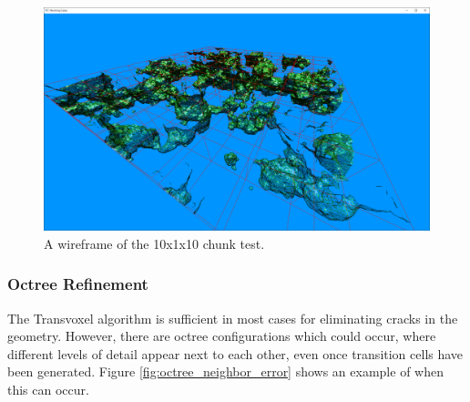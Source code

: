 \documentclass[11pt]{article}
\begin{document}
\begin{figure}[H]
  \includegraphics[width=\textwidth]{10x10_wireframe.png}
  \caption{A wireframe of the 10x1x10 chunk test.}
\end{figure}


\subsubsection{Octree Refinement}
\label{section:octree_refinement}
The Transvoxel algorithm is sufficient in most cases for eliminating cracks in the geometry. However, there are octree configurations which could occur, where different levels of detail appear next to each other, even once transition cells have been generated. Figure \ref{fig:octree_neighbor_error} shows an example of when this can occur.
\end{document}
